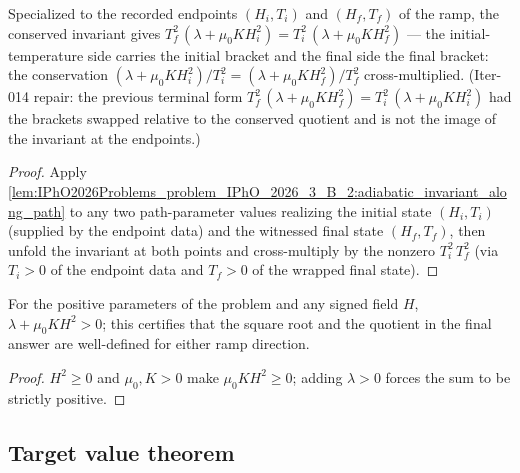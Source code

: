\begin{lemma}
\label{lem:IPhO2026Problems_problem_IPhO_2026_3_B_2:endpoint_relation}
Specialized to the recorded endpoints $(H_i, T_i)$ and $(H_f, T_f)$ of the
ramp, the conserved invariant gives
$T_f^2\,(\lambda + \mu_0 K H_i^2) = T_i^2\,(\lambda + \mu_0 K H_f^2)$ ---
the initial-temperature side carries the initial bracket and the final side
the final bracket: the conservation
$(\lambda + \mu_0 K H_i^2)/T_i^2 = (\lambda + \mu_0 K H_f^2)/T_f^2$
cross-multiplied.  (Iter-014 repair: the previous terminal form
$T_f^2\,(\lambda + \mu_0 K H_f^2) = T_i^2\,(\lambda + \mu_0 K H_i^2)$ had
the brackets swapped relative to the conserved quotient and is not the
image of the invariant at the endpoints.)
\end{lemma}
\begin{proof}
Apply
\cref{lem:IPhO2026Problems_problem_IPhO_2026_3_B_2:adiabatic_invariant_along_path}
to any two path-parameter values realizing the initial state $(H_i, T_i)$
(supplied by the endpoint data) and the witnessed final state $(H_f, T_f)$,
then unfold the invariant at both points and cross-multiply by the nonzero
$T_i^2\,T_f^2$ (via $T_i > 0$ of the endpoint data and $T_f > 0$ of the
wrapped final state).
\end{proof}

\begin{lemma}
\label{lem:IPhO2026Problems_problem_IPhO_2026_3_B_2:lam_add_mu0_K_sq_pos}
For the positive parameters of the problem and any signed field $H$,
$\lambda + \mu_0 K H^2 > 0$; this certifies that the square root and the
quotient in the final answer are well-defined for either ramp direction.
\end{lemma}
\begin{proof}
$H^2 \ge 0$ and $\mu_0, K > 0$ make $\mu_0 K H^2 \ge 0$; adding $\lambda > 0$
forces the sum to be strictly positive.
\end{proof}

\subsection*{Target value theorem}

